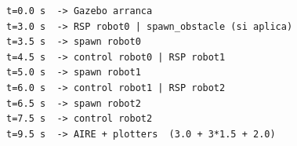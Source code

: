 {\renewcommand{\lstlistingname}{Diagrama}
\begin{figure}[t]
\centering
\begin{lstlisting}[style=bash,
    caption={Línea de tiempo de arranque para n\_robots=3.},
    label={lst:timeline}]
t=0.0 s  -> Gazebo arranca
t=3.0 s  -> RSP robot0 | spawn_obstacle (si aplica)
t=3.5 s  -> spawn robot0
t=4.5 s  -> control robot0 | RSP robot1
t=5.0 s  -> spawn robot1
t=6.0 s  -> control robot1 | RSP robot2
t=6.5 s  -> spawn robot2
t=7.5 s  -> control robot2
t=9.5 s  -> AIRE + plotters  (3.0 + 3*1.5 + 2.0)
\end{lstlisting}
\end{figure}
}
